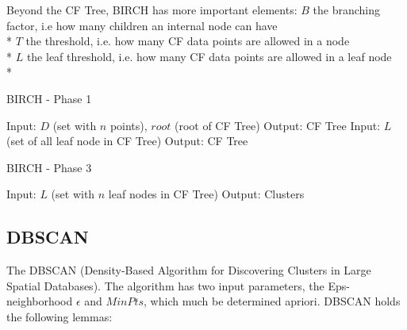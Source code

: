 \documentclass[conference, 10pt]{IEEEtran}
\begin{document}
  Beyond the CF Tree, BIRCH has more important elements:\vspace{1 mm}
  $B$ the branching factor, i.e how many children an internal node can have\\*
  $T$ the threshold, i.e. how many CF data points are allowed in a node\\*
  $L$ the leaf threshold, i.e. how many CF data points are allowed in a leaf node\\*

  \begin{algorithm}
  \caption{BIRCH - Phase 1}
  \begin{algorithmic}[1]
      \State Input: $D$ (set with $n$ points), $root$ (root of CF Tree)
      \State Output: CF Tree
          \Else
        \EndIf
      \EndFor
    \EndProcedure
      \State Input: $L$ (set of all leaf node in CF Tree)
      \State Output: CF Tree
    \EndProcedure
  \end{algorithmic}
  \end{algorithm}

  \begin{algorithm}
  \caption{BIRCH - Phase 3}
  \begin{algorithmic}[1]
      \State Input: $L$ (set with $n$ leaf nodes in CF Tree)
      \State Output: Clusters
        \EndIf
      \EndFor
    \EndProcedure
  \end{algorithmic}
  \end{algorithm}

  \subsection{DBSCAN}
  The DBSCAN (Density-Based Algorithm for Discovering Clusters in Large Spatial Databases). The algorithm has two input parameters, the Eps-neighborhood $\epsilon$ and $MinPts$, which much be determined apriori. DBSCAN holds the following lemmas:
\end{document}
